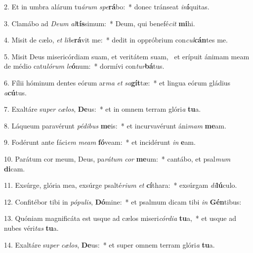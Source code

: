 2. Et in umbra alárum tu\textit{á}\textit{rum} \textit{spe}\textbf{rá}bo:~*  donec tránseat \textit{in}\textbf{í}quitas.\

3. Clamábo ad \textit{De}\textit{um} \textit{al}\textbf{tís}simum:~*  Deum, qui benefé\textit{cit} \textbf{mi}hi.\

4. Misit de cælo, \textit{et} \textit{li}\textit{be}\textbf{rá}vit me:~*  dedit in oppróbrium con\textit{cul}\textbf{cán}tes me.\

5. Misit Deus misericórdiam suam, et veritátem suam, \dag\  et erípuit ánimam meam de médio catu\textit{ló}\textit{rum} \textit{le}\textbf{ó}num:~*  dormívi con\textit{tur}\textbf{bá}tus.\

6. Fílii hóminum dentes eórum ar\textit{ma} \textit{et} \textit{sa}\textbf{gít}tæ:~*  et lingua eórum gládius \textit{a}\textbf{cú}tus.\

7. Exaltáre su\textit{per} \textit{cæ}\textit{los}, \textbf{De}us:~*  et in omnem terram glóri\textit{a} \textbf{tu}a.\

8. Láqueum paravérunt \textit{pé}\textit{di}\textit{bus} \textbf{me}is:~*  et incurvavérunt áni\textit{mam} \textbf{me}am.\

9. Fodérunt ante fáci\textit{em} \textit{me}\textit{am} \textbf{fó}veam:~*  et incidérunt \textit{in} \textbf{e}am.\

10. Parátum cor meum, Deus, pa\textit{rá}\textit{tum} \textit{cor} \textbf{me}um:~*  cantábo, et psal\textit{mum} \textbf{di}cam.\

11. Exsúrge, glória mea, exsúrge psalté\textit{ri}\textit{um} \textit{et} \textbf{cí}thara:~*  exsúrgam \textit{di}\textbf{lú}culo.\

12. Confitébor tibi in \textit{pó}\textit{pu}\textit{lis}, \textbf{Dó}mine:~*  et psalmum dicam tibi \textit{in} \textbf{Gén}tibus:\

13. Quóniam magnificáta est usque ad cælos miseri\textit{cór}\textit{di}\textit{a} \textbf{tu}a,~*  et usque ad nubes véri\textit{tas} \textbf{tu}a.\

14. Exaltáre su\textit{per} \textit{cæ}\textit{los}, \textbf{De}us:~*  et super omnem terram glóri\textit{a} \textbf{tu}a.\

